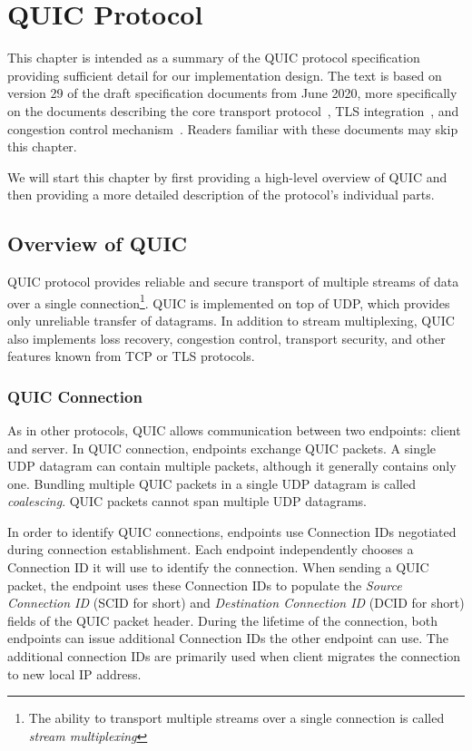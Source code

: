 \chapter{QUIC Protocol}\label{chap:02-quic}

This chapter is intended as a summary of the QUIC protocol specification providing sufficient detail
for our implementation design. The text is based on version 29 of the draft specification documents
from June 2020, more specifically on the documents describing the core transport
protocol~\cite{draft-ietf-quic-transport}, TLS integration~\cite{draft-ietf-quic-tls}, and
congestion control mechanism~\cite{draft-ietf-quic-recovery}. Readers familiar with these documents
may skip this chapter.

We will start this chapter by first providing a high-level overview of QUIC and then providing a
more detailed description of the protocol's individual parts.

\section{Overview of QUIC}

QUIC protocol provides reliable and secure transport of multiple streams of data over a single
connection\footnote{The ability to transport multiple streams over a single connection is called
\textit{stream multiplexing}}. QUIC is implemented on top of UDP, which provides only unreliable
transfer of datagrams. In addition to stream multiplexing, QUIC also implements loss recovery,
congestion control, transport security, and other features known from TCP or TLS protocols.

\subsection{QUIC Connection}

As in other protocols, QUIC allows communication between two endpoints: client and server. In QUIC
connection, endpoints exchange QUIC packets. A single UDP datagram can contain multiple packets,
although it generally contains only one. Bundling multiple QUIC packets in a single UDP datagram is
called \textit{coalescing}. QUIC packets cannot span multiple UDP datagrams.

In order to identify QUIC connections, endpoints use Connection IDs negotiated during connection
establishment. Each endpoint independently chooses a Connection ID it will use to identify the
connection. When sending a QUIC packet, the endpoint uses these Connection IDs to populate the
\textit{Source Connection ID} (SCID for short) and \textit{Destination Connection ID} (DCID for
short) fields of the QUIC packet header. During the lifetime of the connection, both endpoints can
issue additional Connection IDs the other endpoint can use. The additional connection IDs are
primarily used when client migrates the connection to new local IP address.

